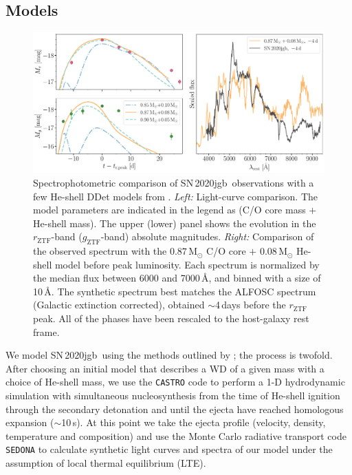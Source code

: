 \documentclass[twocolumn]{aastex631}
\newcommand{\sn}{SN\,2020jgb}
\begin{document}
\subsection{Models} \label{sec:model}
\begin{figure}
    \centering
    \includegraphics[width=\textwidth]{model.pdf}
    \caption{Spectrophotometric comparison of \sn\ observations with a few He-shell DDet models from \citet{polin_observational_2019}. {\it Left:} Light-curve comparison. The model parameters are indicated in the legend as (C/O core mass $+$ He-shell mass). The upper (lower) panel shows the evolution in the $r_\mathrm{ZTF}$-band ($g_\mathrm{ZTF}$-band) absolute magnitudes. {\it Right:} Comparison of the observed spectrum with the $0.87\,\mathrm{M_\odot}$ C/O core $+$ $0.08\,\mathrm{M_\odot}$ He-shell model before peak luminosity. Each spectrum is normalized by the median flux between 6000 and 7000\,\AA, and binned with a size of 10\,\AA. The synthetic spectrum best matches the ALFOSC spectrum (Galactic extinction corrected), obtained $\sim$4\,days before the $r_\mathrm{ZTF}$ peak. All of the phases have been rescaled to the host-galaxy rest frame.}
    \label{fig:model}
\end{figure}

We model \sn\ using the methods outlined by \citet{polin_observational_2019}; the process is twofold. After choosing an initial model that describes a WD of a given mass with a choice of He-shell mass, we use the \texttt{CASTRO} code \citep{Almgren_Castro_2010} to perform a 1-D hydrodynamic simulation with simultaneous nucleosynthesis from the time of He-shell ignition through the secondary detonation and until the ejecta have reached homologous expansion ($\sim$10\,s). At this point we take the ejecta profile (velocity, density, temperature and composition) and use the Monte Carlo radiative transport code \texttt{SEDONA} \citep{Kasen_Sedona_2006} to calculate synthetic light curves and spectra of our model under the assumption of local thermal equilibrium (LTE). 
\end{document}
